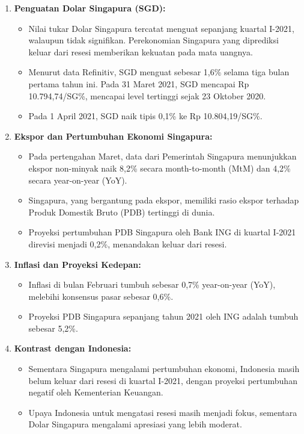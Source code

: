 \documentclass[12pt]{article}
\begin{document}
\begin{enumerate}
    \item \textbf{Penguatan Dolar Singapura (SGD):}
    \begin{itemize}
        \item Nilai tukar Dolar Singapura tercatat menguat sepanjang kuartal I-2021, walaupun tidak signifikan. Perekonomian Singapura yang diprediksi keluar dari resesi memberikan kekuatan pada mata uangnya.
        \item Menurut data Refinitiv, SGD menguat sebesar 1,6\% selama tiga bulan pertama tahun ini. Pada 31 Maret 2021, SGD mencapai Rp 10.794,74/SG\%, mencapai level tertinggi sejak 23 Oktober 2020.
        \item Pada 1 April 2021, SGD naik tipis 0,1\% ke Rp 10.804,19/SG\%.
    \end{itemize}

    \item \textbf{Ekspor dan Pertumbuhan Ekonomi Singapura:}
    \begin{itemize}
        \item Pada pertengahan Maret, data dari Pemerintah Singapura menunjukkan ekspor non-minyak naik 8,2\% secara month-to-month (MtM) dan 4,2\% secara year-on-year (YoY).
        \item Singapura, yang bergantung pada ekspor, memiliki rasio ekspor terhadap Produk Domestik Bruto (PDB) tertinggi di dunia.
        \item Proyeksi pertumbuhan PDB Singapura oleh Bank ING di kuartal I-2021 direvisi menjadi 0,2\%, menandakan keluar dari resesi.
    \end{itemize}

    \item \textbf{Inflasi dan Proyeksi Kedepan:}
    \begin{itemize}
        \item Inflasi di bulan Februari tumbuh sebesar 0,7\% year-on-year (YoY), melebihi konsensus pasar sebesar 0,6\%.
        \item Proyeksi PDB Singapura sepanjang tahun 2021 oleh ING adalah tumbuh sebesar 5,2\%.
    \end{itemize}

    \item \textbf{Kontrast dengan Indonesia:}
    \begin{itemize}
        \item Sementara Singapura mengalami pertumbuhan ekonomi, Indonesia masih belum keluar dari resesi di kuartal I-2021, dengan proyeksi pertumbuhan negatif oleh Kementerian Keuangan.
        \item Upaya Indonesia untuk mengatasi resesi masih menjadi fokus, sementara Dolar Singapura mengalami apresiasi yang lebih moderat.
    \end{itemize}
\end{enumerate} \autocite{Putu_Agus_Pransuamitra_2021_APRIL_cnbcindonesia}
\end{document}
